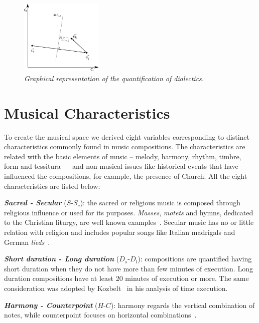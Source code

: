 \documentclass[
 aip,
 jmp,
 amsmath,amssymb,
 reprint,
]{revtex4-1}
\begin{document}
\begin{figure}
        \begin{center}
                \includegraphics[width=0.35\textwidth]{dialetica_.eps}
        \end{center}
        \caption{\it Graphical representation of the quantification of dialectics\cite{Fabbri}.}
        \label{fig.2}
\end{figure}




\section{Musical Characteristics}

To create the musical space we derived eight variables corresponding to
distinct characteristics commonly found in music compositions. The
characteristics are related with the basic elements of music -- melody,
harmony, rhythm, timbre, form and tessitura~\cite{BennettHistory} -- and
non-musical issues like historical events that have influenced the
compositions, for example, the
presence of Church. All the eight
characteristics are listed below:

{\bf \em{ Sacred - Secular}} ($S$-$S_c$): the sacred or religious music is
composed through religious influence or used for its purposes. \textit{Masses},
\textit{motets} and hymns, dedicated to the Christian liturgy, are well known examples~\cite{Lovelock}. Secular
music has no or little relation with religion and includes
popular songs like Italian madrigals and German \textit{lieds}~\cite{BennettHistory}. 

{\bf \em{ Short duration - Long duration}} ($D_s$-$D_l$): compositions are
quantified having short duration when they do not have more than few minutes
of execution. Long duration compositions have at least 20 minutes of execution or
more. The same consideration was adopted by Kozbelt~\cite{Kozbelt01012009,
  Kozbelt01012007} in his analysis of time execution.

{\bf \em{ Harmony - Counterpoint}} ($H$-$C$): harmony regards the
vertical combination of notes, while counterpoint focuses on
horizontal combinations~\cite{BennettHistory}.
\end{document}

